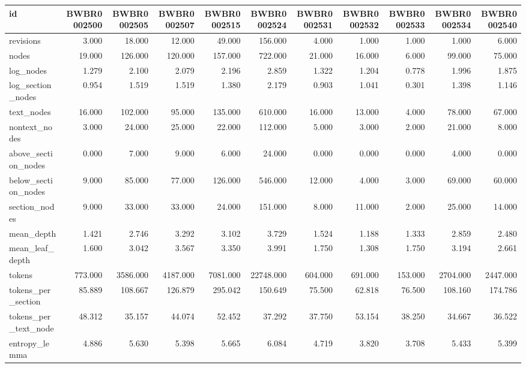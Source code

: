 \begin{tabular}{lrrrrrrrrrr}
\toprule
id & BWBR0002500 & BWBR0002505 & BWBR0002507 & BWBR0002515 & BWBR0002524 & BWBR0002531 & BWBR0002532 & BWBR0002533 & BWBR0002534 & BWBR0002540 \\
\midrule
revisions & 3.000 & 18.000 & 12.000 & 49.000 & 156.000 & 4.000 & 1.000 & 1.000 & 1.000 & 6.000 \\
\cline{1-11}
nodes & 19.000 & 126.000 & 120.000 & 157.000 & 722.000 & 21.000 & 16.000 & 6.000 & 99.000 & 75.000 \\
\cline{1-11}
log\_nodes & 1.279 & 2.100 & 2.079 & 2.196 & 2.859 & 1.322 & 1.204 & 0.778 & 1.996 & 1.875 \\
\cline{1-11}
log\_section\_nodes & 0.954 & 1.519 & 1.519 & 1.380 & 2.179 & 0.903 & 1.041 & 0.301 & 1.398 & 1.146 \\
\cline{1-11}
text\_nodes & 16.000 & 102.000 & 95.000 & 135.000 & 610.000 & 16.000 & 13.000 & 4.000 & 78.000 & 67.000 \\
\cline{1-11}
nontext\_nodes & 3.000 & 24.000 & 25.000 & 22.000 & 112.000 & 5.000 & 3.000 & 2.000 & 21.000 & 8.000 \\
\cline{1-11}
above\_section\_nodes & 0.000 & 7.000 & 9.000 & 6.000 & 24.000 & 0.000 & 0.000 & 0.000 & 4.000 & 0.000 \\
\cline{1-11}
below\_section\_nodes & 9.000 & 85.000 & 77.000 & 126.000 & 546.000 & 12.000 & 4.000 & 3.000 & 69.000 & 60.000 \\
\cline{1-11}
section\_nodes & 9.000 & 33.000 & 33.000 & 24.000 & 151.000 & 8.000 & 11.000 & 2.000 & 25.000 & 14.000 \\
\cline{1-11}
mean\_depth & 1.421 & 2.746 & 3.292 & 3.102 & 3.729 & 1.524 & 1.188 & 1.333 & 2.859 & 2.480 \\
\cline{1-11}
mean\_leaf\_depth & 1.600 & 3.042 & 3.567 & 3.350 & 3.991 & 1.750 & 1.308 & 1.750 & 3.194 & 2.661 \\
\cline{1-11}
tokens & 773.000 & 3586.000 & 4187.000 & 7081.000 & 22748.000 & 604.000 & 691.000 & 153.000 & 2704.000 & 2447.000 \\
\cline{1-11}
tokens\_per\_section & 85.889 & 108.667 & 126.879 & 295.042 & 150.649 & 75.500 & 62.818 & 76.500 & 108.160 & 174.786 \\
\cline{1-11}
tokens\_per\_text\_node & 48.312 & 35.157 & 44.074 & 52.452 & 37.292 & 37.750 & 53.154 & 38.250 & 34.667 & 36.522 \\
\cline{1-11}
entropy\_lemma & 4.886 & 5.630 & 5.398 & 5.665 & 6.084 & 4.719 & 3.820 & 3.708 & 5.433 & 5.399 \\

\end{tabular}
